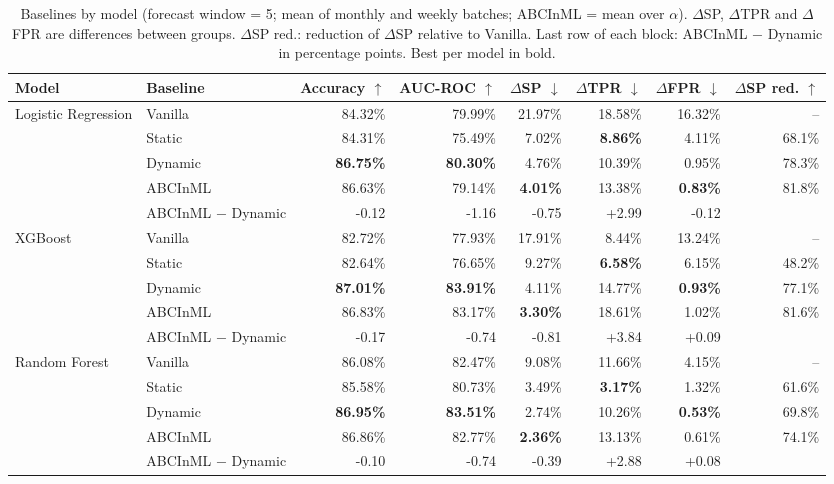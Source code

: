 \begin{table}
  \small
  \caption{Baselines by model (forecast window = 5; mean of monthly and weekly batches; ABCInML = mean over $\alpha$). $\Delta$SP, $\Delta$TPR and $\Delta$FPR are differences between groups. $\Delta$SP red.: reduction of $\Delta$SP relative to Vanilla. Last row of each block: ABCInML $-$ Dynamic in percentage points. Best per model in bold.}
  \label{tab:baselines-models}
  \begin{tabular}{llrrrrrr}
    \toprule
    Model & Baseline & Accuracy $\uparrow$ & AUC-ROC $\uparrow$ & $\Delta$SP $\downarrow$ & $\Delta$TPR $\downarrow$ & $\Delta$FPR $\downarrow$ & $\Delta$SP red. $\uparrow$ \\
    \midrule
    Logistic Regression & Vanilla & 84.32\% & 79.99\% & 21.97\% & 18.58\% & 16.32\% & -- \\
     & Static & 84.31\% & 75.49\% & 7.02\% & \textbf{8.86\%} & 4.11\% & 68.1\% \\
     & Dynamic & \textbf{86.75\%} & \textbf{80.30\%} & 4.76\% & 10.39\% & 0.95\% & 78.3\% \\
     & ABCInML & 86.63\% & 79.14\% & \textbf{4.01\%} & 13.38\% & \textbf{0.83\%} & 81.8\% \\
     & ABCInML $-$ Dynamic & -0.12 & -1.16 & -0.75 & +2.99 & -0.12 & \\
    \midrule
    XGBoost & Vanilla & 82.72\% & 77.93\% & 17.91\% & 8.44\% & 13.24\% & -- \\
     & Static & 82.64\% & 76.65\% & 9.27\% & \textbf{6.58\%} & 6.15\% & 48.2\% \\
     & Dynamic & \textbf{87.01\%} & \textbf{83.91\%} & 4.11\% & 14.77\% & \textbf{0.93\%} & 77.1\% \\
     & ABCInML & 86.83\% & 83.17\% & \textbf{3.30\%} & 18.61\% & 1.02\% & 81.6\% \\
     & ABCInML $-$ Dynamic & -0.17 & -0.74 & -0.81 & +3.84 & +0.09 & \\
    \midrule
    Random Forest & Vanilla & 86.08\% & 82.47\% & 9.08\% & 11.66\% & 4.15\% & -- \\
     & Static & 85.58\% & 80.73\% & 3.49\% & \textbf{3.17\%} & 1.32\% & 61.6\% \\
     & Dynamic & \textbf{86.95\%} & \textbf{83.51\%} & 2.74\% & 10.26\% & \textbf{0.53\%} & 69.8\% \\
     & ABCInML & 86.86\% & 82.77\% & \textbf{2.36\%} & 13.13\% & 0.61\% & 74.1\% \\
     & ABCInML $-$ Dynamic & -0.10 & -0.74 & -0.39 & +2.88 & +0.08 & \\
    \bottomrule
  \end{tabular}
\end{table}
